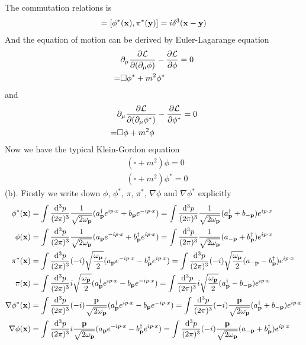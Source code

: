 \documentclass{article}
\begin{document}
The commutation relations is
\begin{align}
  [\phi(\vb{x}),\pi(\vb{y})]=[\phi^*(\vb{x}),\pi^*(\vb{y})]=i\delta^3(\vb{x}-\vb{y})
\end{align}
And the equation of motion can be derived by Euler-Lagarange equation
\begin{align*}
  &\partial_{\mu}\pdv{\mathcal{L}}{(\partial_{\mu}\phi)}-\pdv{\mathcal{L}}{\phi}=0\\
  =&\square\phi^*+m^2\phi^*
\end{align*}
and
\begin{align*}
  &\partial_{\mu}\pdv{\mathcal{L}}{(\partial_{\mu}\phi^*)}-\pdv{\mathcal{L}}{\phi^*}=0\\
  =&\square\phi+m^2\phi
\end{align*}
Now we have the typical Klein-Gordon equation
\begin{align}
  &(\square+m^2)\phi=0\\
  &(\square+m^2)\phi^*=0
\end{align}
\makebox{\phantom{2.1}}\quad(b).
Firstly we write down $\phi$, $\phi^*$, $\pi$, $\pi^*$, $\nabla \phi$ and $\nabla\phi^*$ explicitly
\begin{align}
  \phi^*(\vb{x})&=\int\frac{\dd^3p}{(2\pi)^3}\frac{1}{\sqrt{2\omega_{\vb{p}}}}(a_{\vb{p}}^{\dagger}e^{ip\cdot x}+b_{\vb{p}}e^{-ip\cdot x})
  =\int\frac{\dd^3p}{(2\pi)^3}\frac{1}{\sqrt{2\omega_{\vb{p}}}}(a_{\vb{p}}^{\dagger}+b_{-\vb{p}})e^{ip\cdot x}\\
  \phi(\vb{x})&=\int\frac{\dd^3p}{(2\pi)^3}\frac{1}{\sqrt{2\omega_{\vb{p}}}}(a_{\vb{p}}e^{-ip\cdot x}+b_{\vb{p}}^{\dagger}e^{ip\cdot x})
  =\int\frac{\dd^3p}{(2\pi)^3}\frac{1}{\sqrt{2\omega_{\vb{p}}}}(a_{-\vb{p}}+b_{\vb{p}}^{\dagger})e^{ip\cdot x}\\
  \pi^*(\vb{x})&=\int\frac{\dd^3p}{(2\pi)^3}(-i)\sqrt{\frac{\omega_{\vb{p}}}{2}}(a_{\vb{p}}e^{-ip\cdot x}-b_{\vb{p}}^{\dagger}e^{ip\cdot x})
  =\int\frac{\dd^3p}{(2\pi)^3}(-i)\sqrt{\frac{\omega_{\vb{p}}}{2}}(a_{-\vb{p}}-b_{\vb{p}}^{\dagger})e^{ip\cdot x}\\
  \pi(\vb{x})&=\int\frac{\dd^3p}{(2\pi)^3}i\sqrt{\frac{\omega_{\vb{p}}}{2}}(a_{\vb{p}}^{\dagger}e^{ip\cdot x}-b_{\vb{p}}e^{-ip\cdot x})
  =\int\frac{\dd^3p}{(2\pi)^3}i\sqrt{\frac{\omega_{\vb{p}}}{2}}(a_{\vb{p}}^{\dagger}-b_{-\vb{p}})e^{ip\cdot x}\\
  \nabla\phi^*(\vb{x})&=\int\frac{\dd^3p}{(2\pi)^3}(-i)\frac{\vb{p}}{\sqrt{2\omega_{\vb{p}}}}(a_{\vb{p}}^{\dagger}e^{ip\cdot x}-b_{\vb{p}}e^{-ip\cdot x})
  =\int\frac{\dd^3p}{(2\pi)^3}(-i)\frac{\vb{p}}{\sqrt{2\omega_{\vb{p}}}}(a_{\vb{p}}^{\dagger}+b_{-\vb{p}})e^{ip\cdot x}\\
  \nabla\phi(\vb{x})&=\int\frac{\dd^3p}{(2\pi)^3}i\frac{\vb{p}}{\sqrt{2\omega_{\vb{p}}}}(a_{\vb{p}}e^{-ip\cdot x}-b_{\vb{p}}^{\dagger}e^{ip\cdot x})
  =\int\frac{\dd^3p}{(2\pi)^3}(-i)\frac{\vb{p}}{\sqrt{2\omega_{\vb{p}}}}(a_{-\vb{p}}+b_{\vb{p}}^{\dagger})e^{ip\cdot x}
\end{align}
\end{document}
